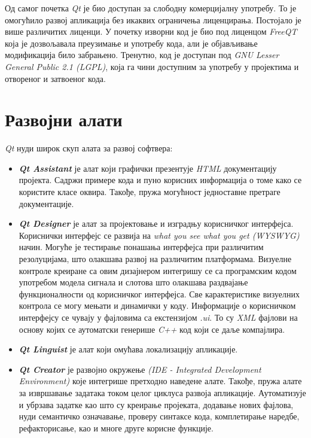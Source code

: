 \documentclass[11pt,a4paper,serbian,oneside]{book}
\begin{document}
Од самог почетка \textit{Qt} је био доступан за слободну комерцијалну употребу. То је омо\-гу\-ћи\-ло развој апликација без икаквих ограничења лиценцирања. Постојало је више различитих лиценци. У почетку изворни код је био под лиценцом \textit{FreeQT} која је дозвољавала пре\-у\-зи\-ма\-ње и употребу кода, али је објављивање модификација било забрањено. Тренутно, код је доступан под \textit{GNU Lesser General Public 2.1 (LGPL)}, која га чини доступним за употребу у пројектима и отвореног и затвоеног кода.

\section{Развојни алати}

\textit{Qt} нуди широк скуп алата за развој софтвера:
\begin{itemize}
  \item \textbf{\textit{Qt Assistant}} је алат који графички презентује \textit{HTML} документацију пројекта. Са\-држи примере кода и пуно корисних информација о томе како се користите класе оквира. Такође, пружа могућност једноставне претраге документације.

  \item \textbf{\textit{Qt Designer}} је алат за пројектовање и изградњу корисничког интерфејса. Ко\-ри\-сни\-чки интерфејс се развија на \textit{what you see what you get (WYSWYG)} начин. Могуће је тестирање понашања интерфејса при различитим резолуцијама, што олакшава развој на различитим платформама. Визуелне контроле креиране са овим дизајнером интегришу се са програмским кодом употребом модела сигнала и слотова што олакшава раздвајање функционалности од корисничког интерфејса. Све карактеристике ви\-зу\-ел\-них контрола се могу мењати и динамички у коду. Информације о корисничком интерфејсу се чувају у фајловима са екстензијом \textit{.ui}. То су \textit{XML} фајлови на основу којих се аутоматски генерише \textit{C++} код који се даље компајлира.

  \item \textbf{\textit{Qt Linguist}} је алат који омућава локализацију апликације.

  \item \textbf{\textit{Qt Creator}} је развојно окружење \textit{(IDE - Integrated Development Environment)} које интегрише претходно наведене алате. Такође, пружа алате за извршавање задатака током целог циклуса развоја апликације. Аутоматизује и убрзава задатке као што су креирање пројеката, додавање нових фајлова, нуди семантичко означавање, проверу синтаксе кода, комплетирање наредбе, рефакторисање, као и многе друге корисне функције.
\end{itemize}
\end{document}
